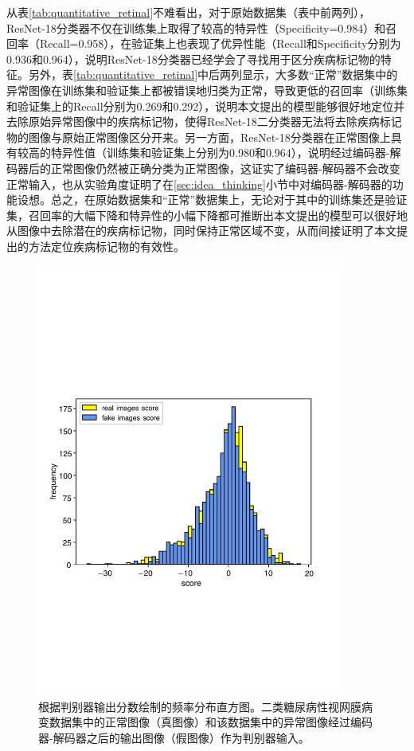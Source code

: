 从表\ref{tab:quantitative_retinal}不难看出，对于原始数据集（表中前两列），ResNet-18分类器不仅在训练集上取得了较高的特异性（Specificity=0.984）和召回率（Recall=0.958），在验证集上也表现了优异性能（Recall和Specificity分别为0.936和0.964），说明ResNet-18分类器已经学会了寻找用于区分疾病标记物的特征。另外，表\ref{tab:quantitative_retinal}中后两列显示，大多数“正常”数据集中的异常图像在训练集和验证集上都被错误地归类为正常，导致更低的召回率（训练集和验证集上的Recall分别为0.269和0.292），说明本文提出的模型能够很好地定位并去除原始异常图像中的疾病标记物，使得ResNet-18二分类器无法将去除疾病标记物的图像与原始正常图像区分开来。另一方面，ResNet-18分类器在正常图像上具有较高的特异性值（训练集和验证集上分别为0.980和0.964），说明经过编码器-解码器后的正常图像仍然被正确分类为正常图像，这证实了编码器-解码器不会改变正常输入，也从实验角度证明了在\ref{sec:idea_thinking}小节中对编码器-解码器的功能设想。总之，在原始数据集和“正常”数据集上，无论对于其中的训练集还是验证集，召回率的大幅下降和特异性的小幅下降都可推断出本文提出的模型可以很好地从图像中去除潜在的疾病标记物，同时保持正常区域不变，从而间接证明了本文提出的方法定位疾病标记物的有效性。
\begin{figure}[h]
	\centering
	\includegraphics[width=0.9\textwidth]{figure/score_distribution}
	\caption[根据判别器输出分数绘制的频率分布直方图]{根据判别器输出分数绘制的频率分布直方图。二类糖尿病性视网膜病变数据集中的正常图像（真图像）和该数据集中的异常图像经过编码器-解码器之后的输出图像（假图像）作为判别器输入。}
	\label{fig:hist_freq}
\end{figure}

